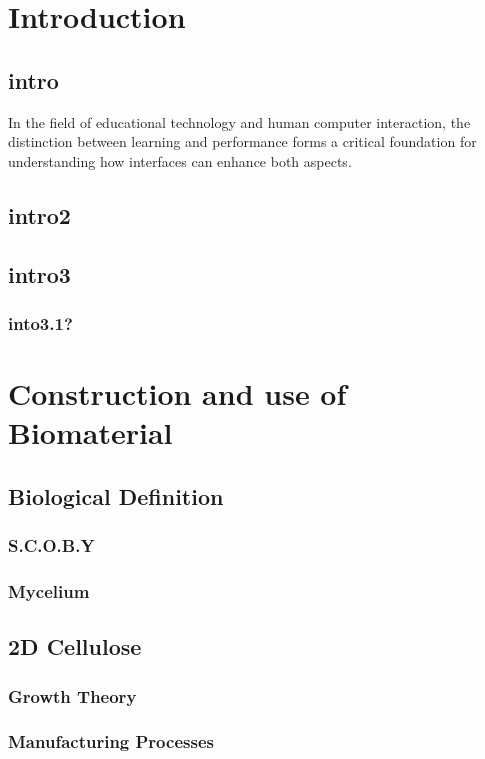 \chapter{Introduction}

\section{intro}
In the field of educational technology and human computer interaction, the distinction between learning
and performance forms a critical foundation for understanding how interfaces can enhance both aspects.
\section{intro2}
\section{intro3}
\subsection{into3.1?}


\chapter{Construction and use of Biomaterial}


\section{Biological Definition}

\subsection{S.C.O.B.Y}
\subsection{Mycelium}

\section{2D Cellulose}

\subsection{Growth Theory}
\subsection{Manufacturing Processes}


